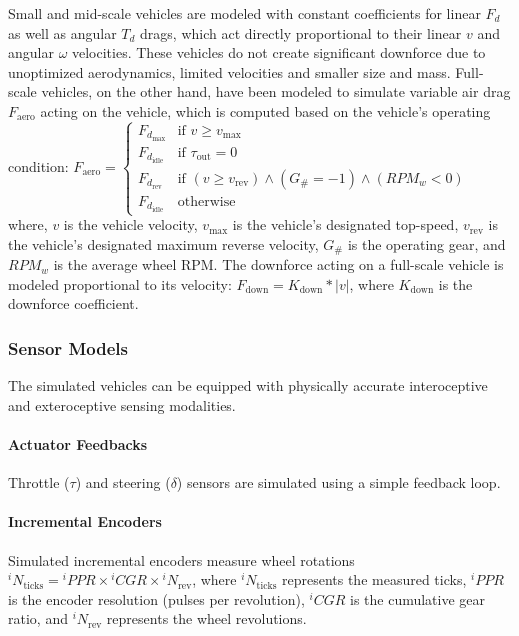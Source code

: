 Small and mid-scale vehicles are modeled with constant coefficients for linear $F_d$ as well as angular $T_d$ drags, which act directly proportional to their linear $v$ and angular $\omega$ velocities. These vehicles do not create significant downforce due to unoptimized aerodynamics, limited velocities and smaller size and mass. Full-scale vehicles, on the other hand, have been modeled to simulate variable air drag $F_\text{aero}$ acting on the vehicle, which is computed based on the vehicle’s operating condition:
$
F_{\text{aero}} = \begin{cases}
F_{d_\text{max}} & \text{if } v \geq v_{\text{max}} \\
F_{d_\text{idle}} & \text{if } \tau_{\text{out}} = 0 \\
F_{d_\text{rev}} & \text{if } (v \geq v_{\text{rev}}) \land (G_\# = -1) \land (RPM_{w} < 0) \\
F_{d_\text{idle}} & \text{otherwise}
\end{cases}
$
where, $v$ is the vehicle velocity, $v_\text{max}$ is the vehicle's designated top-speed, $v_\text{rev}$ is the vehicle's designated maximum reverse velocity, $G_\#$ is the operating gear, and $RPM_w$ is the average wheel RPM. The downforce acting on a full-scale vehicle is modeled proportional to its velocity: $F_\text{down}=K_\text{down}*|v|$, where $K_\text{down}$ is the downforce coefficient.

\subsubsection{Sensor Models}
\label{Sensor Models}

The simulated vehicles can be equipped with physically accurate interoceptive and exteroceptive sensing modalities.

\paragraph{Actuator Feedbacks}
\label{Actuator Feedbacks}

Throttle ($\tau$) and steering ($\delta$) sensors are simulated using a simple feedback loop.

\paragraph{Incremental Encoders}
\label{Incremental Encoders}

Simulated incremental encoders measure wheel rotations $^iN_{\text{ticks}} = {^iPPR} \times {^iCGR} \times {^iN_{\text{rev}}}$, where $^iN_{\text{ticks}}$ represents the measured ticks, $^iPPR$ is the encoder resolution (pulses per revolution), $^iCGR$ is the cumulative gear ratio, and $^iN_{\text{rev}}$ represents the wheel revolutions.

